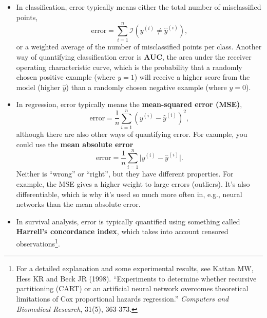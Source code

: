 \begin{itemize}
\item In classification, error typically means either the total number of misclassified points,
$$ \text{error} = \sum_{i=1}^n \mathcal{I}\left(y^{(i)} \neq \hat{y}^{(i)}\right), $$
or a weighted average of the number of misclassified points per class. Another way of quantifying classification error is \textbf{AUC}, the area under the receiver operating characteristic curve, which is the probability that a randomly chosen positive example (where $y=1$) will receive a higher score from the model (higher $\hat{y}$) than a randomly chosen negative example (where $y=0$). 
\item In regression, error typically means the \textbf{mean-squared error (MSE)},
$$ \text{error} = \frac{1}{n} \sum_{i=1}^n \left( y^{(i)} - \hat{y}^{(i)} \right)^2, $$
although there are also other ways of quantifying error. For example, you could use the \textbf{mean absolute error}
$$ \text{error} = \frac{1}{n} \sum_{i=1}^n \vert y^{(i)} - \hat{y}^{(i)} \vert. $$
Neither is ``wrong'' or ``right'', but they have different properties. For example, the MSE gives a higher weight to large errors (outliers). It's also differentiable, which is why it's used so much more often in, e.g., neural networks than the mean absolute error. 
\item In survival analysis, error is typically quantified using something called \textbf{Harrell's concordance index}, which takes into account censored observations\footnote{For a detailed explanation and some experimental results, see Kattan MW, Hess KR and Beck JR (1998). ``Experiments to determine whether recursive partitioning (CART) or an artificial neural network overcomes theoretical limitations of Cox proportional hazards regression.'' \emph{Computers and Biomedical Research}, 31(5), 363-373.}.
\end{itemize}

\vspace{2mm}

